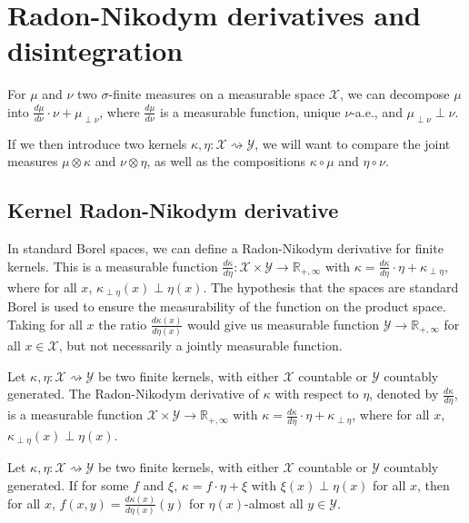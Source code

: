 \chapter{Radon-Nikodym derivatives and disintegration}
\label{app:rnDeriv}

For $\mu$ and $\nu$ two $\sigma$-finite measures on a measurable space $\mathcal{X}$, we can decompose $\mu$ into $\frac{d \mu}{d \nu} \cdot \nu + \mu_{\perp \nu}$, where $\frac{d \mu}{d \nu}$ is a measurable function, unique $\nu$-a.e., and $\mu_{\perp \nu} \perp \nu$.

If we then introduce two kernels $\kappa, \eta : \mathcal X \rightsquigarrow \mathcal Y$, we will want to compare the joint measures $\mu \otimes \kappa$ and $\nu \otimes \eta$, as well as the compositions $\kappa \circ \mu$ and $\eta \circ \nu$.


\section{Kernel Radon-Nikodym derivative}

In standard Borel spaces, we can define a Radon-Nikodym derivative for finite kernels.
This is a measurable function $\frac{d \kappa}{d \eta} : \mathcal X \times \mathcal Y \to \mathbb{R}_{+, \infty}$ with $\kappa = \frac{d \kappa}{d \eta} \cdot \eta + \kappa_{\perp \eta}$, where for all $x$, $\kappa_{\perp \eta}(x) \perp \eta(x)$.
The hypothesis that the spaces are standard Borel is used to ensure the measurability of the function on the product space.
Taking for all $x$ the ratio $\frac{d \kappa(x)}{d \eta(x)}$ would give us measurable function $\mathcal Y \to \mathbb{R}_{+, \infty}$ for all $x \in \mathcal X$, but not necessarily a jointly measurable function.

\begin{definition}
  \label{def:kernel_rnDeriv}
  \leanok
  Let $\kappa, \eta : \mathcal X \rightsquigarrow \mathcal Y$ be two finite kernels, with either $\mathcal X$ countable or $\mathcal{Y}$ countably generated. The Radon-Nikodym derivative of $\kappa$ with respect to $\eta$, denoted by $\frac{d \kappa}{d \eta}$, is a measurable function $\mathcal X \times \mathcal Y \to \mathbb{R}_{+, \infty}$ with $\kappa = \frac{d \kappa}{d \eta} \cdot \eta + \kappa_{\perp \eta}$, where for all $x$, $\kappa_{\perp \eta}(x) \perp \eta(x)$.
\end{definition}


\begin{lemma}
  \label{lem:rnDeriv_unique}
  \leanok
  Let $\kappa, \eta : \mathcal X \rightsquigarrow \mathcal Y$ be two finite kernels, with either $\mathcal X$ countable or $\mathcal{Y}$ countably generated. If for some $f$ and $\xi$, $\kappa = f \cdot \eta + \xi$ with $\xi(x) \perp \eta(x)$ for all $x$, then for all $x$, $f(x, y) = \frac{d \kappa(x)}{d \eta(x)}(y)$ for $\eta(x)$-almost all $y \in \mathcal Y$.
\end{lemma}

